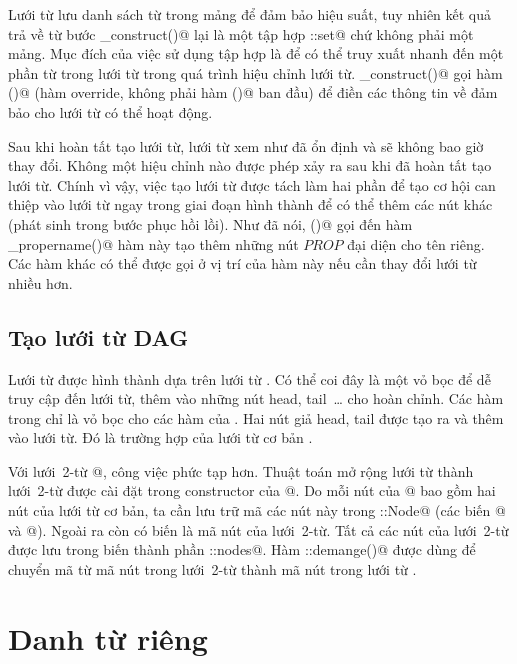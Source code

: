 \documentclass[a4paper,oneside,14pt]{extbook} %
\begin{document}
Lưới từ lưu danh sách từ trong mảng để đảm bảo hiệu suất, tuy nhiên
kết quả trả về từ bước \verb@pre_construct()@ 
lại là một tập hợp \verb@std::set@ chứ không phải một mảng. Mục đích
của việc sử dụng tập hợp là để có thể truy xuất nhanh đến một phần từ
trong lưới từ trong quá trình hiệu chỉnh lưới
từ. \verb@post_construct()@ gọi hàm \verb@construct()@ (hàm override,
không phải hàm \verb@construct()@ ban đầu) để điền các thông tin về
\verb@WordInfos@ đảm bảo cho lưới từ có thể hoạt động.

Sau khi hoàn tất tạo lưới từ, lưới từ xem như đã ổn định và sẽ không
bao giờ thay đổi. Không một hiệu chỉnh nào được phép xảy ra sau khi đã
hoàn tất tạo lưới từ. Chính vì vậy, việc tạo lưới từ được tách làm hai
phần để tạo cơ hội can thiệp vào lưới từ ngay trong giai đoạn hình
thành để có thể thêm các nút khác (phát sinh trong bước phục hồi
lồi). Như đã nói, \verb@construct()@ gọi đến hàm
\verb@mark_propername()@ hàm này tạo thêm những nút $PROP$ đại diện
cho tên riêng. Các hàm khác có thể được gọi ở vị trí của hàm này nếu
cần thay đổi lưới từ nhiều hơn.

\subsection{Tạo lưới từ DAG}

Lưới từ \verb@DAG@ được hình thành dựa trên lưới từ \verb@Lattice@. Có
thể coi đây là một vỏ bọc để dễ truy cập đến lưới từ, thêm vào những
nút head, tail~\ldots{} cho hoàn chỉnh. Các hàm trong \verb@DAG@ chỉ
là vỏ bọc cho các hàm của \verb@Lattice@. Hai nút giả head, tail được
tạo ra và thêm vào lưới từ. Đó là trường hợp của lưới từ cơ bản
\verb@WordDAG@. 

Với lưới~2-từ @, công việc phức tạp hơn. Thuật toán mở
rộng lưới từ thành lưới~2-từ được cài đặt trong constructor của
@.  Do mỗi nút của @ bao gồm hai nút của
lưới từ cơ bản, ta cần lưu trữ mã các nút này trong
::Node@ (các biến @ và @). Ngoài ra còn
có biến \verb@id@ là mã nút của lưới~2-từ. Tất cả các nút của
lưới~2-từ được lưu trong biến thành phần ::nodes@. Hàm
::demange()@ được dùng để chuyển mã từ mã nút trong
lưới~2-từ thành mã nút trong lưới từ \verb@WordDAG@.


\section{Danh từ riêng}
\end{document}
